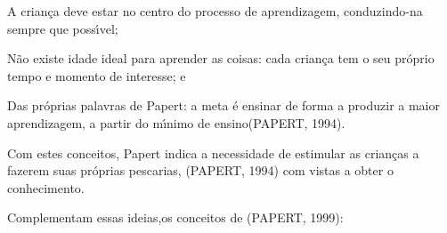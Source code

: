 \documentclass[
12pt,		%
openright,	%
twoside,  %
a4paper,			%
chapter=TITLE,		%
english,			%
french,				%
spanish,			%
brazil				%
]{USPSC-classe/USPSC}
\begin{document}
\begin{alineas}
\item A crian\c{c}a deve estar no centro do processo de aprendizagem, conduzindo-na sempre que poss\'{\i}vel;
\item N\~ao existe idade ideal para aprender as coisas: cada crian\c{c}a tem o seu pr\'oprio tempo e momento de interesse; e
\item Das pr\'oprias palavras de Papert: \textquotedbl a meta \'e ensinar de forma a produzir a maior aprendizagem, a partir do m\'{\i}nimo de ensino\textquotedbl   (PAPERT, 1994).
\end{alineas}

Com estes conceitos, Papert indica a necessidade de estimular as crian\c{c}as a fazerem suas pr\'oprias pescarias,  (PAPERT, 1994) com vistas a obter o conhecimento.

















Complementam essas ideias,os conceitos de (PAPERT, 1999):
\end{document}
